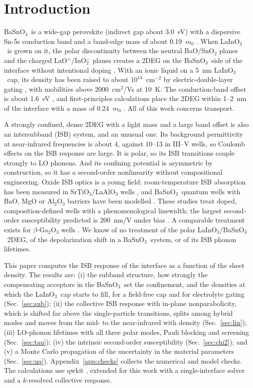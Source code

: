 \documentclass[11pt]{article}
\newcommand{\LIO}{\texorpdfstring{LaInO$_3$}{LaInO3}}
\newcommand{\BSO}{\texorpdfstring{BaSnO$_3$}{BaSnO3}}
\begin{document}
\section{Introduction}
\BSO\ is a wide-gap perovskite (indirect gap about 3.0~eV) with a dispersive Sn-5s conduction band and a band-edge mass of about 0.19~$m_0$ \cite{Niedermeier2017,Aggoune2022}. When \LIO\ is grown on it, the polar discontinuity between the neutral BaO/SnO$_2$ planes and the charged LaO$^+$/InO$_2^-$ planes creates a 2DEG on the \BSO\ side of the interface without intentional doping \cite{Kim2019LIO,Aggoune2021}. With an ionic liquid on a 5~nm \LIO\ cap, its density has been raised to about $10^{14}$~cm$^{-2}$ by electric-double-layer gating \cite{Lee2024LIO,Ueno2008}, with mobilities above 2000~cm$^2$/Vs at 10~K. The conduction-band offset is about 1.6~eV \cite{Kim2019LIO,Lee2024LIO}, and first-principles calculations place the 2DEG within 1--2~nm of the interface with a mass of 0.24~$m_0$ \cite{Aggoune2021}. All of this work concerns transport.

A strongly confined, dense 2DEG with a light mass and a large band offset is also an intersubband (ISB) system, and an unusual one. Its background permittivity at near-infrared frequencies is about 4, against 10--13 in III--V wells, so Coulomb effects on the ISB response are large. It is polar, so its ISB transitions couple strongly to LO phonons. And its confining potential is asymmetric by construction, so it has a second-order nonlinearity without compositional engineering. Oxide ISB optics is a young field: room-temperature ISB absorption has been measured in SrTiO$_3$/LaAlO$_3$ wells \cite{Ortmann2018}, and \BSO\ quantum wells with BaO, MgO or Al$_2$O$_3$ barriers have been modelled \cite{Li2021BSO,Stanojevic2023,Jang2023}. These studies treat doped, composition-defined wells with a phenomenological linewidth; the largest second-order susceptibility predicted is 200~nm/V under bias \cite{Li2021BSO}. A comparable treatment exists for $\beta$-Ga$_2$O$_3$ wells \cite{Lyman2020}. We know of no treatment of the polar \LIO/\BSO\ 2DEG, of the depolarization shift in a \BSO\ system, or of its ISB phonon lifetimes.

This paper computes the ISB response of the interface as a function of the sheet density. The results are: (i) the subband structure, how strongly the compensating acceptors in the \BSO\ set the confinement, and the densities at which the \LIO\ cap starts to fill, for a field-free cap and for electrolyte gating (Sec.~\ref{sec:sub}); (ii) the collective ISB response with in-plane nonparabolicity, which is shifted far above the single-particle transitions, splits among hybrid modes and moves from the mid- to the near-infrared with density (Sec.~\ref{sec:lin}); (iii) LO-phonon lifetimes with all three polar modes, Pauli blocking and screening (Sec.~\ref{sec:tau}); (iv) the intrinsic second-order susceptibility (Sec.~\ref{sec:chi2}); and (v) a Monte Carlo propagation of the uncertainty in the material parameters (Sec.~\ref{sec:uq}). Appendix~\ref{app:checks} collects the numerical and model checks. The calculations use qwkit \cite{qwkit}, extended for this work with a single-interface solver and a $k$-resolved collective response.
\end{document}
